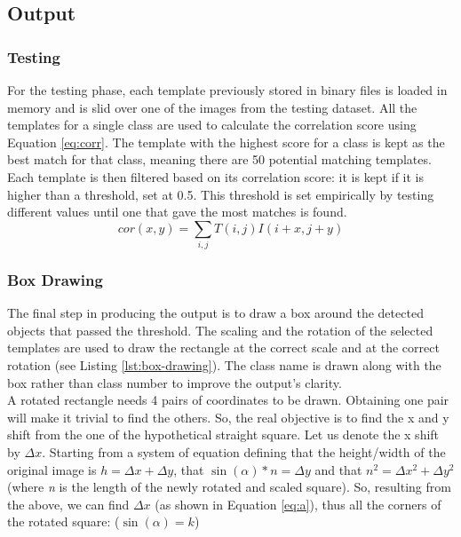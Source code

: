 \documentclass[a4paper,11pt,twocolumn]{article}
\begin{document}
\subsection{Output}

\subsubsection{Testing}

For the testing phase, each template previously stored in binary files is loaded in memory and is slid over one of the images from the testing dataset. All the templates for a single class are used to calculate the correlation score using Equation \ref{eq:corr}. The template with the highest score for a class is kept as the best match for that class, meaning there are 50 potential matching templates. Each template is then filtered based on its correlation score: it is kept if it is higher than a threshold, set at 0.5. This threshold is set empirically by testing different values until one that gave the most matches is found. \\

\begin{equation}
\label{eq:corr}
    cor(x,y) = \sum_{i,j} T(i,j) I(i+x, j+y)
\end{equation}

\subsubsection{Box Drawing}

The final step in producing the output is to draw a box around the detected objects that passed the threshold. The scaling and the rotation of the selected templates are used to draw the rectangle at the correct scale and at the correct rotation (see Listing \ref{lst:box-drawing}). The class name is drawn along with the box rather than class number to improve the output's clarity.\\

A rotated rectangle needs 4 pairs of coordinates to be drawn. Obtaining one pair will make it trivial to find the others. So, the real objective is to find the x and y shift from the one of the hypothetical straight square. Let us denote the x shift by $\Delta x$. Starting from a system of equation defining that the height/width of the original image is $h = \Delta x + \Delta y$, that $\sin(\alpha)*n = \Delta y$ and that $n^2 = \Delta x^2 + \Delta y^2$ (where \textit{n} is the length of the newly rotated and scaled square). So, resulting from the above, we can find $\Delta x$ (as shown in Equation \ref{eq:a}), thus all the corners of the rotated square: ($\sin(\alpha) = k$)
\end{document}
